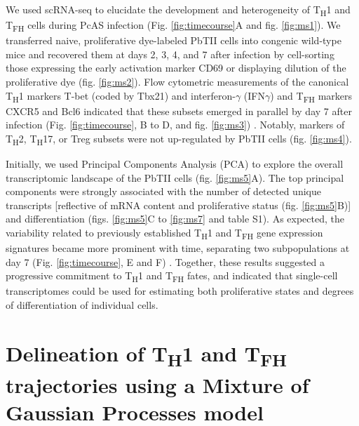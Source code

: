 We used scRNA-seq to elucidate the development and heterogeneity of T\textsubscript{H}1 and T\textsubscript{FH} cells during PcAS infection (Fig. \ref{fig:timecourse}A and fig. \ref{fig:ms1}). We transferred naive, proliferative dye-labeled PbTII cells into congenic wild-type mice and recovered them at days 2, 3, 4, and 7 after infection by cell-sorting those expressing the early activation marker CD69 or displaying dilution of the proliferative dye (fig. \ref{fig:ms2}). Flow cytometric measurements of the canonical T\textsubscript{H}1 markers T-bet (coded by Tbx21) and interferon-\( \gamma \) (IFN\( \gamma \)) and T\textsubscript{FH} markers CXCR5 and Bcl6 indicated that these subsets emerged in parallel by day 7 after infection (Fig. \ref{fig:timecourse}, B to D, and fig. \ref{fig:ms3}) \cite{Johnston2009-rz, Szabo2000-dh}. Notably, markers of T\textsubscript{H}2, T\textsubscript{H}17, or Treg subsets were not up-regulated by PbTII cells (fig. \ref{fig:ms4}).

Initially, we used Principal Components Analysis (PCA) to explore the overall transcriptomic landscape of the PbTII cells (fig. \ref{fig:ms5}A). The top principal components were strongly associated with the number of detected unique transcripts [reflective of mRNA content and proliferative status (fig. \ref{fig:ms5}B)] and differentiation (figs. \ref{fig:ms5}C to \ref{fig:ms7} and table S1). As expected, the variability related to previously established T\textsubscript{H}1 and T\textsubscript{FH} gene expression signatures became more prominent with time, separating two subpopulations at day 7 (Fig. \ref{fig:timecourse}, E and F) \cite{Hale2013-yb}. Together, these results suggested a progressive commitment to T\textsubscript{H}1 and T\textsubscript{FH} fates, and indicated that single-cell transcriptomes could be used for estimating both proliferative states and degrees of differentiation of individual cells.

\section{Delineation of \texorpdfstring{T\textsubscript{H}1}{TH1} and \texorpdfstring{T\textsubscript{FH}}{TFH} trajectories using a Mixture of Gaussian Processes model}


